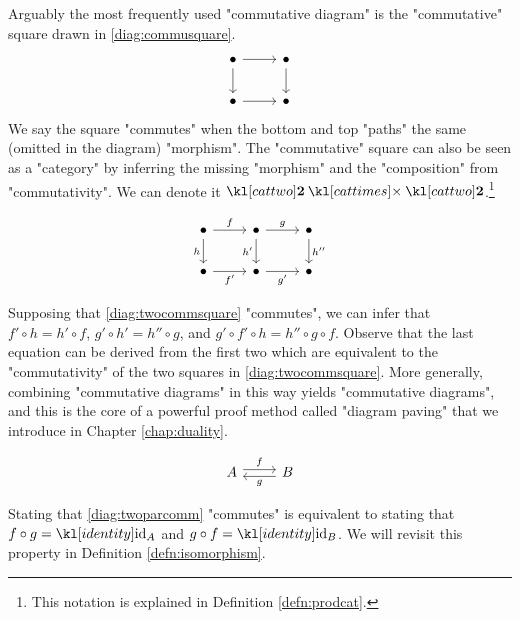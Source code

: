 \documentclass[main.tex]{subfiles}
\begin{document}
\begin{exmps}
	Arguably the most frequently used "commutative diagram" is the "commutative" square drawn in \eqref{diag:commusquare}.
	\begin{equation}\label{diag:commusquare}\begin{tikzcd}
		\bullet \arrow[r] \arrow[d] & \bullet \arrow[d] \\
		\bullet \arrow[r]           & \bullet          
	\end{tikzcd}\end{equation}
	We say the square "commutes" when the bottom and top "paths"  the same (omitted in the diagram) "morphism". The "commutative" square can also be seen as a "category" by inferring the missing "morphism" and the "composition" from "commutativity". We can denote it $\cattwo \cattimes \cattwo$.\footnote{This notation is explained in Definition \ref{defn:prodcat}.}
	\begin{marginfigure}\begin{equation}\label{diag:twocommsquare}
		\begin{tikzcd}
			\bullet & \bullet & \bullet \\
			\bullet & \bullet & \bullet
			\arrow["h"', from=1-1, to=2-1]
			\arrow["{f'}"', from=2-1, to=2-2]
			\arrow["f", from=1-1, to=1-2]
			\arrow["g", from=1-2, to=1-3]
			\arrow["{g'}"', from=2-2, to=2-3]
			\arrow["{h''}", from=1-3, to=2-3]
			\arrow["{h'}"', from=1-2, to=2-2]
		\end{tikzcd}
	\end{equation}\end{marginfigure}
	Supposing that \eqref{diag:twocommsquare} "commutes", we can infer that $f' \circ h = h' \circ f$, $g' \circ h' = h'' \circ g$, and $g' \circ f' \circ h = h'' \circ g \circ f$. Observe that the last equation can be derived from the first two which are equivalent to the "commutativity" of the two squares in \eqref{diag:twocommsquare}. More generally, combining "commutative diagrams" in this way yields "commutative diagrams", and this is the core of a powerful proof method called "diagram paving" that we introduce in Chapter \ref{chap:duality}.
	\begin{marginfigure}\begin{equation}\label{diag:twoparcomm}
		\begin{tikzcd}
			A & B
			\arrow["f", shift left=1, from=1-1, to=1-2]
			\arrow["g", shift left=1, from=1-2, to=1-1]
		\end{tikzcd}
	\end{equation}\end{marginfigure}
	Stating that \eqref{diag:twoparcomm} "commutes" is equivalent to stating that $f \circ g = \id_A$ and $g \circ f = \id_B$. We will revisit this property in Definition \ref{defn:isomorphism}.
	

\end{exmps}
\end{document}
